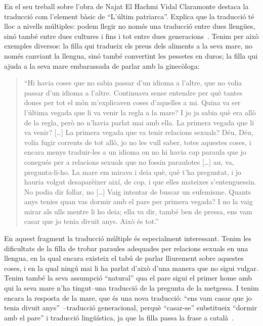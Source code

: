 En el seu treball sobre l'obra de Najat El Hachmi Vidal Claramonte destaca la traducció com l'element bàsic de ``L'últim patriarca''.
Explica que la traducció té lloc a nivells múltiples: podem llegir no només una traducció entre dues llengües, sinó també entre dues cultures i fins i tot entre dues generacions~\autocite{Vidal2012}.
Tenim per això exemples diversos:
la filla qui tradueix els preus dels aliments a la seva mare, no només canviant la llengua, sinó també convertint les pessetes en duros;
la filla qui ajuda a la seva mare embarassada de parlar amb la ginecòloga:
\begin{quote}
``Hi havia coses que no sabia passar d'un idioma a l'altre, que no volia passar d'un idioma a l'altre. Continuava sense entendre per què tantes dones per tot el món m'explicaven coses d'aquelles a mi. Quina va ser l'última vegada que li va venir la regla a la mare? I jo ja sabia què era allò de la regla, però no n'havia parlat mai amb ella. La primera vegada que li va venir? [\ldots] La primera vegada que va tenir relacions sexuals? Déu, Déu, volia fugir corrents de tot allò, jo no les vull saber, totes aquestes coses, i encara menys traduir-les a un idioma on no hi havia cap paraula que jo conegués per a relacions sexuals que no fossin paraulotes [\ldots] au, va, pregunta-li-ho. La mare em mirava i deia què, què t'ha preguntat, i jo hauria volgut desaparèixer així, de cop, i que elles mateixes s'entenguessin. No podia dir follar, no [\ldots] Vaig intentar de buscar un eufemisme. Quants anys tenies quan vas dormir amb el pare per primera vegada? I no la vaig mirar als ulls mentre li ho deia; ella va dir, també ben de pressa, ens vam casar que jo tenia divuit anys. Això és tot.''~\autocite[217]{ElHachmi2008}
\end{quote}
En aquest fragment la traducció múltiple és especialment interessant.
Tenim les dificultats de la filla de trobar paraules adequades per relacions sexuals en una llengua, en la qual encara existeix el tabú de parlar lliurement sobre aquestes coses,
i en la qual ningú mai li ha parlat d'això d'una manera que no sigui vulgar.
Tenim també la seva assumpció ``natural'' qua el pare sigui el primer home amb qui la seva mare n'ha tingut--una traducció de la pregunta de la metgessa.
I tenim encara la resposta de la mare, que és una nova traducció: ``ens vam casar que jo tenia divuit anys''~\autocite[217]{ElHachmi2008}--traducció generacional, perquè ``casar-se'' substitueix ``dormir amb el pare'' i traducció lingüística, ja que la filla passa la frase a català~\autocite{Vidal2012}.

